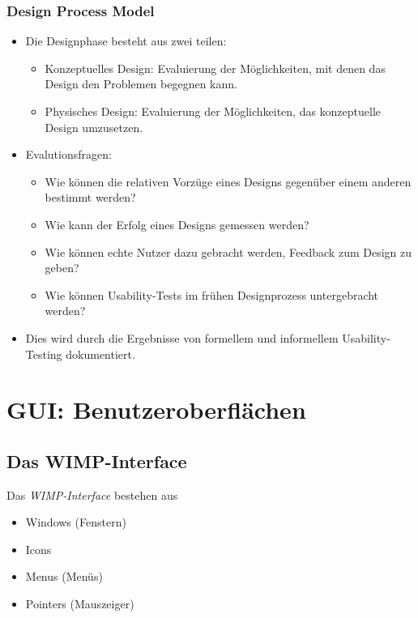 \documentclass[a4paper, 11pt, accentcolor = tud3b]{tudreport}
\begin{document}
				\subsubsection{Design Process Model}
					\begin{itemize}
						\item Die Designphase besteht aus zwei teilen:
							\begin{itemize}
								\item Konzeptuelles Design: Evaluierung der Möglichkeiten, mit denen das Design den Problemen begegnen kann.
								\item Physisches Design: Evaluierung der Möglichkeiten, das konzeptuelle Design umzusetzen.
							\end{itemize}
						\item Evalutionsfragen:
							\begin{itemize}
								\item Wie können die relativen Vorzüge eines Designs gegenüber einem anderen bestimmt werden?
								\item Wie kann der Erfolg eines Designs gemessen werden?
								\item Wie können echte Nutzer dazu gebracht werden, Feedback zum Design zu geben?
								\item Wie können Usability-Tests im frühen Designprozess untergebracht werden?
							\end{itemize}
						\item Dies wird durch die Ergebnisse von formellem und informellem Usability-Testing dokumentiert.
					\end{itemize}

		\section{GUI: Benutzeroberflächen}
			\subsection{Das WIMP-Interface}
				Das \emph{WIMP-Interface} bestehen aus
				\begin{itemize}
					\item Windows (Fenstern)
					\item Icons
					\item Menus (Menüs)
					\item Pointers (Mauszeiger)
				\end{itemize}
\end{document}

